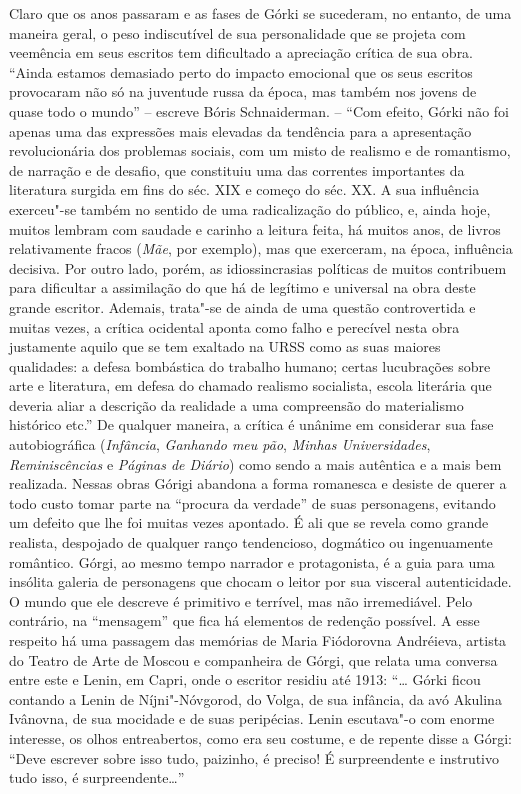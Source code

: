 Claro que os anos passaram e as fases de Górki se sucederam, no entanto,
de uma maneira geral, o peso indiscutível de sua personalidade que se
projeta com veemência em seus escritos tem dificultado a apreciação
crítica de sua obra. ``Ainda estamos demasiado perto do impacto
emocional que os seus escritos provocaram não só na juventude russa da
época, mas também nos jovens de quase todo o mundo'' -- escreve Bóris
Schnaiderman. -- ``Com efeito, Górki não foi apenas uma das expressões
mais elevadas da tendência para a apresentação revolucionária dos
problemas sociais, com um misto de realismo e de romantismo, de narração
e de desafio, que constituiu uma das correntes importantes da literatura
surgida em fins do séc. XIX e começo do séc. XX. A sua influência
exerceu"-se também no sentido de uma radicalização do público, e, ainda
hoje, muitos lembram com saudade e carinho a leitura feita, há muitos
anos, de livros relativamente fracos (\emph{Mãe}, por exemplo), mas que
exerceram, na época, influência decisiva. Por outro lado, porém, as
idiossincrasias políticas de muitos contribuem para dificultar a
assimilação do que há de legítimo e universal na obra deste grande
escritor. Ademais, trata"-se de ainda de uma questão controvertida e
muitas vezes, a crítica ocidental aponta como falho e perecível nesta
obra justamente aquilo que se tem exaltado na URSS como as suas maiores
qualidades: a defesa bombástica do trabalho humano; certas lucubrações
sobre arte e literatura, em defesa do chamado realismo socialista,
escola literária que deveria aliar a descrição da realidade a uma
compreensão do materialismo histórico etc.'' De qualquer maneira, a
crítica é unânime em considerar sua fase autobiográfica
(\emph{Infância}, \emph{Ganhando meu pão}, \emph{Minhas Universidades},
\emph{Reminiscências} e \emph{Páginas de Diário}) como sendo a mais
autêntica e a mais bem realizada. Nessas obras Górigi abandona a forma
romanesca e desiste de querer a todo custo tomar parte na ``procura da
verdade'' de suas personagens, evitando um defeito que lhe foi muitas
vezes apontado. É ali que se revela como grande realista, despojado de
qualquer ranço tendencioso, dogmático ou ingenuamente romântico. Górgi,
ao mesmo tempo narrador e protagonista, é a guia para uma insólita
galeria de personagens que chocam o leitor por sua visceral
autenticidade. O mundo que ele descreve é primitivo e terrível, mas não
irremediável. Pelo contrário, na ``mensagem'' que fica há elementos de
redenção possível. A esse respeito há uma passagem das memórias de Maria
Fiódorovna Andréieva, artista do Teatro de Arte de Moscou e companheira
de Górgi, que relata uma conversa entre este e Lenin, em Capri, onde o
escritor residiu até 1913: ``\ldots{} Górki ficou contando a Lenin de
Níjni"-Nóvgorod, do Volga, de sua infância, da avó Akulina Ivânovna, de
sua mocidade e de suas peripécias. Lenin escutava"-o com enorme
interesse, os olhos entreabertos, como era seu costume, e de repente
disse a Górgi: ``Deve escrever sobre isso tudo, paizinho, é preciso! É
surpreendente e instrutivo tudo isso, é surpreendente\ldots{}''

